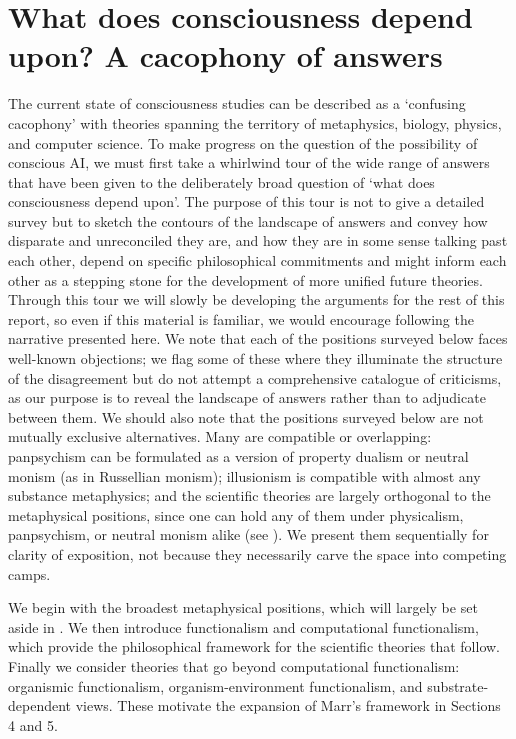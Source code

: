 \documentclass[11pt, a4paper, onecolumn, gdm]{google}
\begin{document}
\section{What does consciousness depend upon? A cacophony of answers}\label{what-does-consciousness-depend-upon-a-cacophony-of-answers}

The current state of consciousness studies can be described as a `confusing cacophony' with theories spanning the territory of metaphysics, biology, physics, and computer science.
To make progress on the question of the possibility of conscious AI, we must first take a whirlwind tour of the wide range of answers that have been given to the deliberately broad question of `what does consciousness depend upon'.
The purpose of this tour is not to give a detailed survey but to sketch the contours of the landscape of answers and convey how disparate and unreconciled they are, and how they are in some sense talking past each other, depend on specific philosophical commitments and might inform each other as a stepping stone for the development of more unified future theories.
Through this tour we will slowly be developing the arguments for the rest of this report, so even if this material is familiar, we would encourage following the narrative presented here.
We note that each of the positions surveyed below faces well-known objections; we flag some of these where they illuminate the structure of the disagreement but do not attempt a comprehensive catalogue of criticisms, as our purpose is to reveal the landscape of answers rather than to adjudicate between them.
We should also note that the positions surveyed below are not mutually exclusive alternatives.
Many are compatible or overlapping: panpsychism can be formulated as a version of property dualism or neutral monism (as in Russellian monism); illusionism is compatible with almost any substance metaphysics; and the scientific theories are largely orthogonal to the metaphysical positions, since one can hold any of them under physicalism, panpsychism, or neutral monism alike (see ).
We present them sequentially for clarity of exposition, not because they necessarily carve the space into competing camps.

We begin with the broadest metaphysical positions, which will largely be set aside in .
We then introduce functionalism and computational functionalism, which provide the philosophical framework for the scientific theories that follow.
Finally we consider theories that go beyond computational functionalism: organismic functionalism, organism-environment functionalism, and substrate-dependent views.
These motivate the expansion of Marr's framework in Sections 4 and 5.
\end{document}
